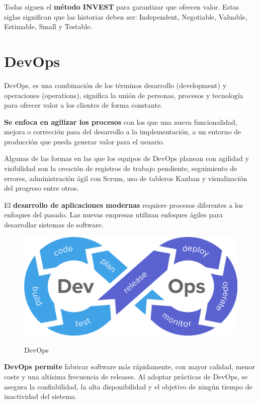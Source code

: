 \documentclass[12pt,twoside,titlepage]{report}
\begin{document}
Todas siguen el \textbf{método INVEST} para garantizar que ofrecen valor. Estas siglas significan que las historias deben ser: Independent, Negotiable, Valuable, Estimable, Small y Testable.

\section{DevOps}

DevOps, es una combinación de los términos desarrollo (development) y operaciones (operations), significa la unión de personas, procesos y tecnología para ofrecer valor a los clientes de forma constante.

\textbf{Se enfoca en agilizar los procesos} con los que una nueva funcionalidad, mejora o corrección pasa del desarrollo a la implementación, a un entorno de producción que pueda generar valor para el usuario.

Algunas de las formas en las que los equipos de DevOps planean con agilidad y visibilidad son la creación de registros de trabajo pendiente, seguimiento de errores, administración ágil con Scrum, uso de tableros Kanban y visualización del progreso entre otros.

El \textbf{desarrollo de aplicaciones modernas} requiere procesos diferentes a los enfoques del pasado. Las nuevas empresas utilizan enfoques ágiles para desarrollar sistemas de software.

\begin{figure}[H]
    \centering
    \includegraphics[scale=0.2]{DevOps/DevOps}
    \label{fig:DevOps}
    \caption{DevOps}
\end{figure}

\textbf{DevOps permite} fabricar software más rápidamente, con mayor calidad, menor coste y una altísima frecuencia de releases. Al adoptar prácticas de DevOps, se asegura la confiabilidad, la alta disponibilidad y el objetivo de ningún tiempo de inactividad del sistema.
\end{document}
